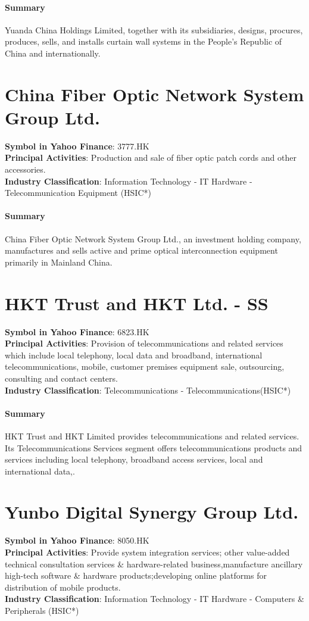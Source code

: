 \paragraph{Summary}
Yuanda China Holdings Limited, together with its subsidiaries, designs, procures, produces, sells, and installs curtain wall systems in the People's Republic of China and internationally.


\section{China Fiber Optic Network System Group Ltd.}
\textbf{Symbol in Yahoo Finance}: 3777.HK\\
\textbf{Principal Activities}: Production and sale of fiber optic patch cords and other accessories.\\
\textbf{Industry Classification}: Information Technology - IT Hardware - Telecommunication Equipment (HSIC*)
\paragraph{Summary}
China Fiber Optic Network System Group Ltd., an investment holding company, manufactures and sells active and prime optical interconnection equipment primarily in Mainland China.


\section{HKT Trust and HKT Ltd. - SS}
\textbf{Symbol in Yahoo Finance}: 6823.HK\\
\textbf{Principal Activities}: Provision of telecommunications and related services which include local telephony, local data and broadband, international telecommunications, mobile, customer premises equipment sale, outsourcing, consulting and contact centers.\\
\textbf{Industry Classification}: Telecommunications - Telecommunications(HSIC*)
\paragraph{Summary}
HKT Trust and HKT Limited provides telecommunications and related services. Its Telecommunications Services segment offers telecommunications products and services including local telephony, broadband access services, local and international data,.


\section{Yunbo Digital Synergy Group Ltd.}
\textbf{Symbol in Yahoo Finance}: 8050.HK\\
\textbf{Principal Activities}: Provide system integration services; other value-added technical consultation services \& hardware-related business,manufacture ancillary high-tech software \& hardware products;developing online platforms for distribution of mobile products.\\
\textbf{Industry Classification}: Information Technology - IT Hardware - Computers \& Peripherals (HSIC*)
